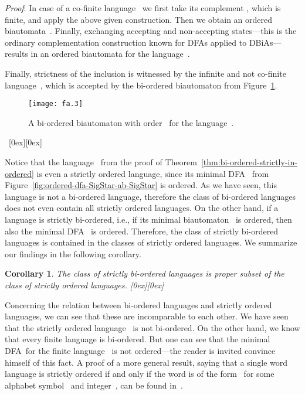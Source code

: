 \documentclass[submission]{eptcs}
\newcommand{\dfa}{\textrm{DFA}}
\newcommand{\dbia}{\textrm{DBiA}}
\newcommand*{\qed}{\raisebox{0.5ex}[0ex][0ex]{\framebox[1ex][l]{}}}
\newtheorem{corollary}[theorem]{Corollary}
\newenvironment{proof}{\par\noindent
  {\rmfamily\itshape\mdseries Proof\/}:\hspace{\labelsep}\ignorespaces}{\mbox{}\nolinebreak\hfill~{\qed}
  \medbreak
}
\begin{document}
\begin{proof}
  In case of a co-finite language~ we first take
  its complement , which is finite, and apply the
  above given construction. Then we obtain an ordered
  biautomata~. Finally, exchanging accepting and non-accepting
  states---this is the ordinary complementation construction known for
  \dfa s applied to \dbia s---results in an ordered biautomata for the
  language~.

  Finally, strictness of the inclusion is witnessed by the infinite
  and not co-finite language~, which is accepted by the
  bi-ordered biautomaton from
  Figure~\ref{fig:ordered-biaut-for-a-star-plus-b}.
\begin{figure}[b]
    \centering
    \texttt{[image: fa.3]}
    \caption{A bi-ordered biautomaton with order~
      for the language~.}
    \label{fig:ordered-biaut-for-a-star-plus-b}
  \end{figure}
\end{proof}

Notice that the language~ from the proof of
Theorem~\ref{thm:bi-ordered-strictly-in-ordered} is even a strictly
ordered language, since its minimal \dfa~ from
Figure~\ref{fig:ordered-dfa-SigStar-ab-SigStar} is ordered.  As we
have seen, this language is not a bi-ordered language, therefore the
class of bi-ordered languages does not even contain all strictly
ordered languages.  On the other hand, if a language is strictly
bi-ordered, i.e., if its minimal biautomaton~ is ordered, then also
the minimal \dfa~ is ordered.  Therefore, the class of
strictly bi-ordered languages is contained in the classes of strictly
ordered languages.  We summarize our findings in the following
corollary.

\begin{corollary}\label{cor:strictly-bi-ordered-strictly-in-strictly-ordered}
  The class of strictly bi-ordered languages is proper subset of 
  the class of strictly ordered languages.  \hfill \qed
\end{corollary}

Concerning the relation between bi-ordered languages and
strictly ordered languages, we can see that these are incomparable to
each other.  We have seen that the strictly ordered language~ is not bi-ordered.  On the other hand, we know that every
finite language is bi-ordered.  But one can see that the minimal \dfa\
for the finite language~ is not ordered---the reader is
invited convince himself of this fact.  A proof of a more general
result, saying that a single word language is strictly ordered if and
only if the word is of the form~ for some alphabet symbol~ and
integer~, can be found in~\cite{ShTh74}.
\end{document}

